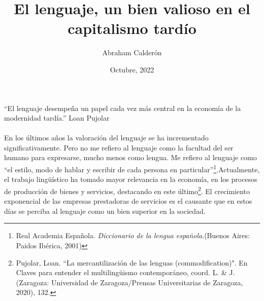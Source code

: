 \documentclass{article}
\title{El lenguaje, un bien valioso en el capitalismo tardío}
\author{Abraham Calderón}
\date{Octubre, 2022}
\begin{document}
    \maketitle
    \begin{multicols}{2}
    \paragraph{}
    \columnbreak
      
    \paragraph{}
    \begin{flushright}
        \columnbreak
        ``El lenguaje desempeña un papel cada vez más central en la economía de la modernidad tardía.''
        \linebreak
        Loan Pujolar
    \end{flushright}


    \end{multicols}

    \paragraph{}
    En los últimos años la valoración del lenguaje se ha incrementado significativamente. Pero no me refiero al lenguaje como la facultad del ser humano para expresarse, mucho menos como lengua. Me refiero al lenguaje como “el estilo, modo de hablar y escribir de cada persona en particular”\footnote{Real Academia Española.\emph{ Diccionario de la lengua española}.(Buenos Aires: Paidos Ibérica, 2001)}.Actualmente, el trabajo lingüístico ha tomado mayor relevancia en la economía, en los procesos de producción de bienes y servicios, destacando en este último\footnote{Pujolar, Loan. ``La mercantilización de las lenguas (commodification)". En Claves para entender el multilingüismo contemporáneo, coord. L. \& J. (Zaragoza: Universidad de Zaragoza/Prensas Universitarias de Zaragoza, 2020), 132.}. El crecimiento exponencial de las empresas prestadoras de servicios es el causante que en estos días se perciba al lenguaje como un bien superior en la sociedad.
\end{document}
